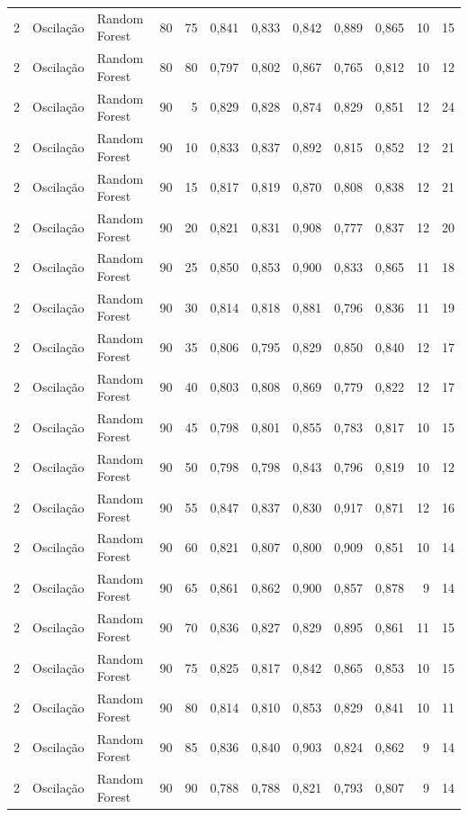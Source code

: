 \begin{longtable}{@{}rllrrrrrrrrr@{}}
2 & Oscilação & Random Forest & 80 & 75 & 0,841 & 0,833 & 0,842 & 0,889 & 0,865 & 10 & 15 \\
2 & Oscilação & Random Forest & 80 & 80 & 0,797 & 0,802 & 0,867 & 0,765 & 0,812 & 10 & 12 \\
2 & Oscilação & Random Forest & 90 & 5 & 0,829 & 0,828 & 0,874 & 0,829 & 0,851 & 12 & 24 \\
2 & Oscilação & Random Forest & 90 & 10 & 0,833 & 0,837 & 0,892 & 0,815 & 0,852 & 12 & 21 \\
2 & Oscilação & Random Forest & 90 & 15 & 0,817 & 0,819 & 0,870 & 0,808 & 0,838 & 12 & 21 \\
2 & Oscilação & Random Forest & 90 & 20 & 0,821 & 0,831 & 0,908 & 0,777 & 0,837 & 12 & 20 \\
2 & Oscilação & Random Forest & 90 & 25 & 0,850 & 0,853 & 0,900 & 0,833 & 0,865 & 11 & 18 \\
2 & Oscilação & Random Forest & 90 & 30 & 0,814 & 0,818 & 0,881 & 0,796 & 0,836 & 11 & 19 \\
2 & Oscilação & Random Forest & 90 & 35 & 0,806 & 0,795 & 0,829 & 0,850 & 0,840 & 12 & 17 \\
2 & Oscilação & Random Forest & 90 & 40 & 0,803 & 0,808 & 0,869 & 0,779 & 0,822 & 12 & 17 \\
2 & Oscilação & Random Forest & 90 & 45 & 0,798 & 0,801 & 0,855 & 0,783 & 0,817 & 10 & 15 \\
2 & Oscilação & Random Forest & 90 & 50 & 0,798 & 0,798 & 0,843 & 0,796 & 0,819 & 10 & 12 \\
2 & Oscilação & Random Forest & 90 & 55 & 0,847 & 0,837 & 0,830 & 0,917 & 0,871 & 12 & 16 \\
2 & Oscilação & Random Forest & 90 & 60 & 0,821 & 0,807 & 0,800 & 0,909 & 0,851 & 10 & 14 \\
2 & Oscilação & Random Forest & 90 & 65 & 0,861 & 0,862 & 0,900 & 0,857 & 0,878 & 9 & 14 \\
2 & Oscilação & Random Forest & 90 & 70 & 0,836 & 0,827 & 0,829 & 0,895 & 0,861 & 11 & 15 \\
2 & Oscilação & Random Forest & 90 & 75 & 0,825 & 0,817 & 0,842 & 0,865 & 0,853 & 10 & 15 \\
2 & Oscilação & Random Forest & 90 & 80 & 0,814 & 0,810 & 0,853 & 0,829 & 0,841 & 10 & 11 \\
2 & Oscilação & Random Forest & 90 & 85 & 0,836 & 0,840 & 0,903 & 0,824 & 0,862 & 9 & 14 \\
2 & Oscilação & Random Forest & 90 & 90 & 0,788 & 0,788 & 0,821 & 0,793 & 0,807 & 9 & 14 \\

\end{longtable}
